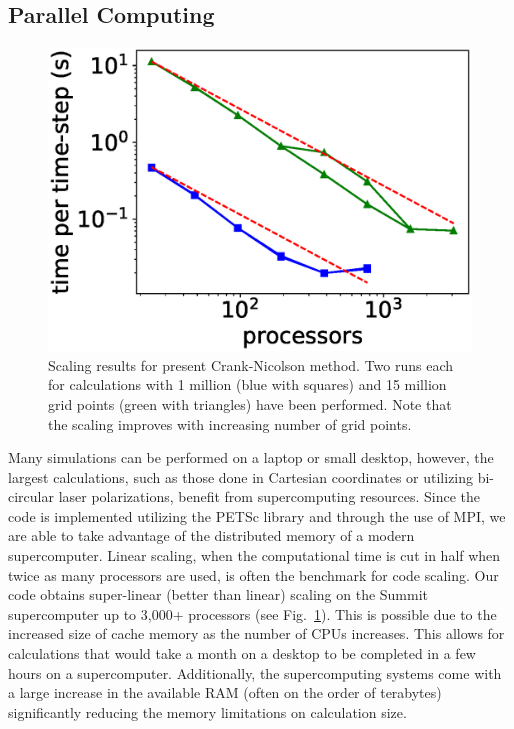 \subsection{Parallel Computing} %
\label{sub:parallel_computing}
\begin{figure}[h!]
\centering
\includegraphics[width=0.5\columnwidth]{figs/Rydberg/multi_node.eps}
\caption{\label{fig:scaling} Scaling results for present Crank-Nicolson method. Two runs each for calculations with 1 million (blue with squares) and 15 million grid points (green with triangles) have been performed. Note that the scaling improves with increasing number of grid points.
}
\end{figure}
Many simulations can be performed on a laptop or small desktop, however, the largest calculations, such as those done in Cartesian coordinates or utilizing bi-circular laser polarizations, benefit from supercomputing resources. Since the code is implemented utilizing the PETSc library and through the use of MPI, we are able to take advantage of the distributed memory of a modern supercomputer. Linear scaling, when the computational time is cut in half when twice as many processors are used, is often the benchmark for code scaling. Our code obtains super-linear (better than linear) scaling on the Summit supercomputer up to 3,000+ processors (see Fig.~\ref{fig:scaling}). This is possible due to the increased size of cache memory as the number of CPUs increases. This allows for calculations that would take a month on a desktop to be completed in a few hours on a supercomputer. Additionally, the supercomputing systems come with a large increase in the available RAM (often on the order of terabytes) significantly reducing the memory limitations on calculation size.




